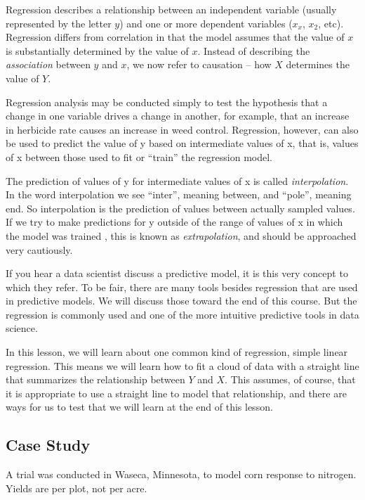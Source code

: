 \documentclass[
]{book}
\begin{document}
Regression describes a relationship between an independent variable (usually represented by the letter \(y\)) and one or more dependent variables (\(x_x\), \(x_2\), etc). Regression differs from correlation in that the model assumes that the value of \(x\) is substantially determined by the value of \(x\). Instead of describing the \emph{association} between \(y\) and \(x\), we now refer to causation -- how \(X\) determines the value of \(Y\).

Regression analysis may be conducted simply to test the hypothesis that a change in one variable drives a change in another, for example, that an increase in herbicide rate causes an increase in weed control. Regression, however, can also be used to predict the value of y based on intermediate values of x, that is, values of x between those used to fit or ``train'' the regression model.

The prediction of values of y for intermediate values of x is called \emph{interpolation}. In the word interpolation we see ``inter'', meaning between, and ``pole'', meaning end. So interpolation is the prediction of values between actually sampled values. If we try to make predictions for y outside of the range of values of x in which the model was trained , this is known as \emph{extrapolation}, and should be approached very cautiously.

If you hear a data scientist discuss a predictive model, it is this very concept to which they refer. To be fair, there are many tools besides regression that are used in predictive models. We will discuss those toward the end of this course. But the regression is commonly used and one of the more intuitive predictive tools in data science.

In this lesson, we will learn about one common kind of regression, simple linear regression. This means we will learn how to fit a cloud of data with a straight line that summarizes the relationship between \(Y\) and \(X\). This assumes, of course, that it is appropriate to use a straight line to model that relationship, and there are ways for us to test that we will learn at the end of this lesson.

\hypertarget{case-study-5}{%
\subsection{Case Study}\label{case-study-5}}

A trial was conducted in Waseca, Minnesota, to model corn response to nitrogen. Yields are per plot, not per acre.
\end{document}
